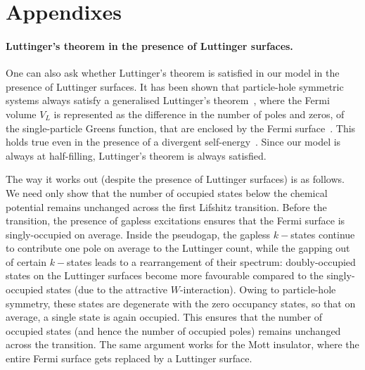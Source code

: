 \documentclass[%
 reprint,
superscriptaddress,
groupedaddress,
 amsmath,amssymb,
 aps,
prl,superscriptaddress
]{revtex4-2}
\begin{document}
\appendix

\section{Appendixes}
\paragraph*{Luttinger's theorem in the presence of Luttinger surfaces.} One can also ask whether Luttinger's theorem is satisfied in our model in the presence of Luttinger surfaces. It has been shown that particle-hole symmetric systems always satisfy a generalised Luttinger's theorem~\cite{seki2017topological}, where the Fermi volume $V_L$ is represented as the difference in the number of poles and zeros, of the single-particle Greens function, that are enclosed by the Fermi surface~\cite{seki2017topological}. This holds true even in the presence of a divergent self-energy~\cite{Phillips2013}. Since our model is always at half-filling, Luttinger's theorem is always satisfied. 

The way it works out (despite the presence of Luttinger surfaces) is as follows. We need only show that the number of occupied states below the chemical potential remains unchanged across the first Lifshitz transition. Before the transition, the presence of gapless excitations ensures that the Fermi surface is singly-occupied on average. Inside the pseudogap, the gapless $k-$states continue to contribute one pole on average to the Luttinger count, while the gapping out of certain $k-$states leads to a rearrangement of their spectrum: doubly-occupied states on the Luttinger surfaces become more favourable compared to the singly-occupied states (due to the attractive $W$-interaction). Owing to particle-hole symmetry, these states are degenerate with the zero occupancy states, so that on average, a single state is again occupied. This ensures that the number of occupied states (and hence the number of occupied poles) remains unchanged across the transition. The same argument works for the Mott insulator, where the entire Fermi surface gets replaced by a Luttinger surface.
\end{document}
